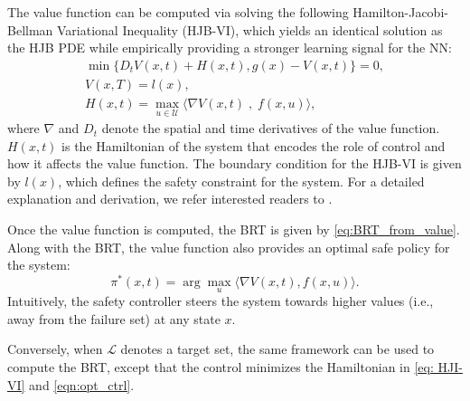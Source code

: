 The value function can be computed via solving the following Hamilton-Jacobi-Bellman Variational Inequality (HJB-VI), which yields an identical solution as the HJB PDE while empirically providing a stronger learning signal for the NN:
% 
\begin{equation}
\begin{gathered}
\label{eq: HJI-VI}
     \min \{D_{t}V(x,t) + H(x,t), g(x) - V(x,t) \} = 0, \\
     V(x,T) = l(x),\\
    H(x,t) = \max_{u \in \mathcal{U}} \langle \nabla V(x,t) \; , \; f(x,u) \rangle, 
\end{gathered}
\end{equation}
% 
where $\nabla$ and $D_t$ denote the spatial and time derivatives of the value function.
$H(x,t)$ is the Hamiltonian of the system that encodes the role of control and how it affects the value function.
The boundary condition for the HJB-VI is given by $l(x)$, which defines the safety constraint for the system. 
For a detailed explanation and derivation, we refer interested readers to \cite{lygeros2004reachability, bokanowski2010reachability, 8263977}.

Once the value function is computed, the BRT is given by \eqref{eq:BRT_from_value}. 
Along with the BRT, the value function also provides an optimal safe policy for the system:
\begin{equation} \label{eqn:opt_ctrl}
    \pi^*(x,t)=\arg \max _u \langle\nabla V(x, t), f(x, u)\rangle .
\end{equation}
Intuitively, the safety controller steers the system towards higher values (i.e., away from the failure set) at any state $x$.

Conversely, when $\mathcal{L}$ denotes a target set, the same framework can be used to compute the BRT, except that the control minimizes the Hamiltonian in \eqref{eq: HJI-VI} and \eqref{eqn:opt_ctrl}.
% 


